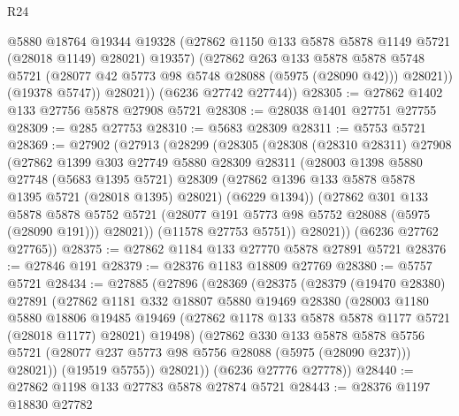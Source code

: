 \begin{lexlean}{R24}
\begin{coremodule}
                @5880
                @18764
                @19344
                @19328
                (@27862 @1150 @133 @5878 @5878 @1149 @5721 (@28018 @1149) @28021)
                @19357)
              (@27862
                @263
                @133
                @5878
                @5878
                @5748
                @5721
                (@28077 @42 @5773 @98 @5748 @28088 (@5975 (@28090 @42)))
                @28021))
            (@19378 @5747))
          @28021))
      (@6236 @27742 @27744))
@28305 := @27862 @1402 @133 @27756 @5878 @27908 @5721
@28308 := @28038 @1401 @27751 @27755
@28309 := @285 @27753
@28310 := @5683 @28309
@28311 := @5753 @5721
@28369 := @27902
    (@27913
      (@28299
        (@28305
          (@28308
            (@28310 @28311)
            @27908
            (@27862
              @1399
              @303
              @27749
              @5880
              @28309
              @28311
              (@28003
                @1398
                @5880
                @27748
                (@5683 @1395 @5721)
                @28309
                (@27862 @1396 @133 @5878 @5878 @1395 @5721 (@28018 @1395) @28021)
                (@6229 @1394))
              (@27862
                @301
                @133
                @5878
                @5878
                @5752
                @5721
                (@28077 @191 @5773 @98 @5752 @28088 (@5975 (@28090 @191)))
                @28021))
            (@11578 @27753 @5751))
          @28021))
      (@6236 @27762 @27765))
@28375 := @27862 @1184 @133 @27770 @5878 @27891 @5721
@28376 := @27846 @191
@28379 := @28376 @1183 @18809 @27769
@28380 := @5757 @5721
@28434 := @27885
    (@27896
      (@28369
        (@28375
          (@28379
            (@19470 @28380)
            @27891
            (@27862
              @1181
              @332
              @18807
              @5880
              @19469
              @28380
              (@28003
                @1180
                @5880
                @18806
                @19485
                @19469
                (@27862 @1178 @133 @5878 @5878 @1177 @5721 (@28018 @1177) @28021)
                @19498)
              (@27862
                @330
                @133
                @5878
                @5878
                @5756
                @5721
                (@28077 @237 @5773 @98 @5756 @28088 (@5975 (@28090 @237)))
                @28021))
            (@19519 @5755))
          @28021))
      (@6236 @27776 @27778))
@28440 := @27862 @1198 @133 @27783 @5878 @27874 @5721
@28443 := @28376 @1197 @18830 @27782

\end{coremodule}
\end{lexlean}
